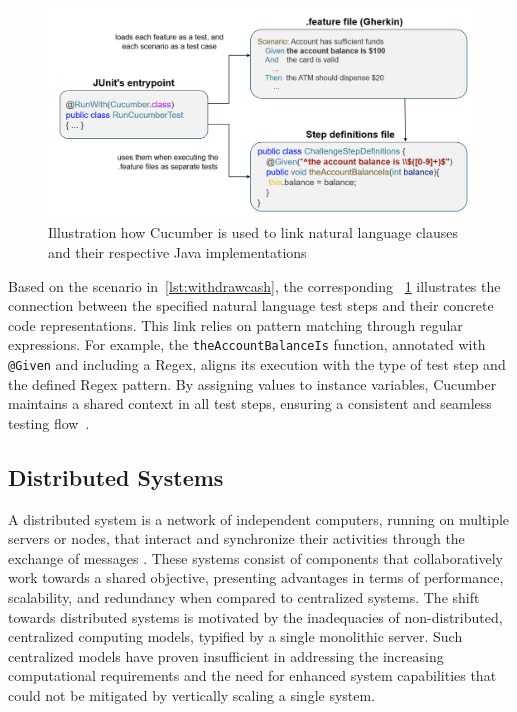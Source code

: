 \begin{figure}
    \centering
    \includegraphics[width=\linewidth]{files/figures/cucumber_test_step_mapping.png}
    \caption{Illustration how Cucumber is used to link natural language clauses and their respective Java implementations}
    \label{fig:cucumber-mapping}
\end{figure}

Based on the scenario in~\cref{lst:withdrawcash}, the corresponding ~\cref{fig:cucumber-mapping} illustrates the connection between the specified natural language test steps and their concrete code representations. This link relies on pattern matching through regular expressions. For example, the \texttt{theAccountBalanceIs} function, annotated with \texttt{@Given} and including a \ac{Regex}, aligns its execution with the type of test step and the defined \ac{Regex} pattern. By assigning values to instance variables, Cucumber maintains a shared context in all test steps, ensuring a consistent and seamless testing flow~\cite{noauthor_bdd_nodate}.

\subsection{Distributed Systems}
\label{subsec:dissys}
A distributed system is a network of independent computers, running on multiple servers or nodes, that interact and synchronize their activities through the exchange of messages \cite{tanenbaum2007distributed}. These systems consist of components that collaboratively work towards a shared objective, presenting advantages in terms of performance, scalability, and redundancy when compared to centralized systems. The shift towards distributed systems is motivated by the inadequacies of non-distributed, centralized computing models, typified by a single monolithic server. Such centralized models have proven insufficient in addressing the increasing computational requirements and the need for enhanced system capabilities that could not be mitigated by vertically scaling a single system.

